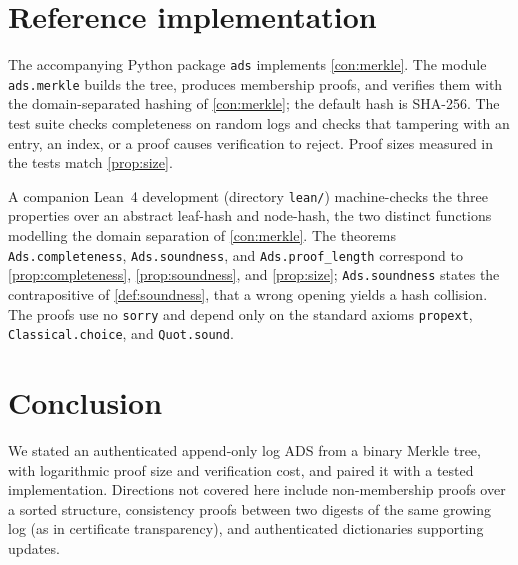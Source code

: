\documentclass[11pt]{article}
\theoremstyle{plain}
\theoremstyle{definition}
\theoremstyle{remark}
\begin{document}
\section{Reference implementation}
\label{sec:impl}

The accompanying Python package \texttt{ads} implements
\cref{con:merkle}. The module \texttt{ads.merkle} builds the tree,
produces membership proofs, and verifies them with the domain-separated
hashing of \cref{con:merkle}; the default hash is SHA-256. The test
suite checks completeness on random logs and checks that tampering with
an entry, an index, or a proof causes verification to reject. Proof
sizes measured in the tests match \cref{prop:size}.

A companion Lean~4 development (directory \texttt{lean/}) machine-checks
the three properties over an abstract leaf-hash and node-hash, the two
distinct functions modelling the domain separation of \cref{con:merkle}.
The theorems \texttt{Ads.completeness}, \texttt{Ads.soundness}, and
\texttt{Ads.proof\_length} correspond to \cref{prop:completeness},
\cref{prop:soundness}, and \cref{prop:size}; \texttt{Ads.soundness}
states the contrapositive of \cref{def:soundness}, that a wrong opening
yields a hash collision. The proofs use no \texttt{sorry} and depend only
on the standard axioms \texttt{propext}, \texttt{Classical.choice}, and
\texttt{Quot.sound}.

\section{Conclusion}
\label{sec:conclusion}

We stated an authenticated append-only log ADS from a binary Merkle
tree, with logarithmic proof size and verification cost, and paired it
with a tested implementation. Directions not covered here include
non-membership proofs over a sorted structure, consistency proofs
between two digests of the same growing log (as in certificate
transparency), and authenticated dictionaries supporting updates.

\printbibliography
\end{document}
